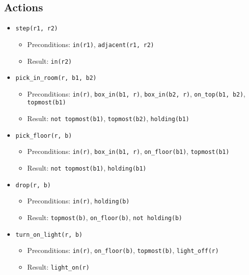 \documentclass[12pt]{article}
\begin{document}
\subsection{Actions}
\begin{itemize}
  \item \texttt{step(r1, r2)}
    \begin{itemize}
      \item Preconditions: \texttt{in(r1)}, \texttt{adjacent(r1, r2)}
      \item Result: \texttt{in(r2)}
    \end{itemize}
  \item \texttt{pick\_in\_room(r, b1, b2)}
    \begin{itemize}
      \item Preconditions: \texttt{in(r)}, \texttt{box\_in(b1, r)}, \texttt{box\_in(b2, r)}, \texttt{on\_top(b1, b2)}, \texttt{topmost(b1)}
      \item Result: \texttt{not topmost(b1)}, \texttt{topmost(b2)}, \texttt{holding(b1)}
    \end{itemize}
  \item \texttt{pick\_floor(r, b)}
    \begin{itemize}
      \item Preconditions: \texttt{in(r)}, \texttt{box\_in(b1, r)}, \texttt{on\_floor(b1)}, \texttt{topmost(b1)}
      \item Result: \texttt{not topmost(b1)}, \texttt{holding(b1)}
    \end{itemize}
  \item \texttt{drop(r, b)}
    \begin{itemize}
      \item Preconditions: \texttt{in(r)}, \texttt{holding(b)}
      \item Result: \texttt{topmost(b)}, \texttt{on\_floor(b)}, \texttt{not holding(b)}
    \end{itemize}
  \item \texttt{turn\_on\_light(r, b)}
    \begin{itemize}
      \item Preconditions: \texttt{in(r)}, \texttt{on\_floor(b)}, \texttt{topmost(b)}, \texttt{light\_off(r)}
      \item Result: \texttt{light\_on(r)}
    \end{itemize}
\end{itemize}
\end{document}
